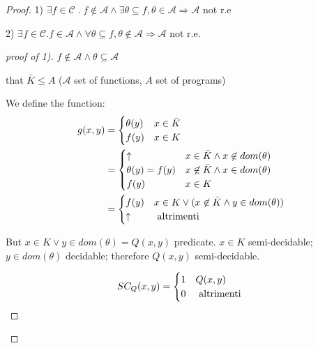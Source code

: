 \begin{theorem}
\begin{proof}
  1)
  $ \exists f \in \mathcal{C} \; . \; f \not\in \mathcal{A} \land
  \exists\theta\subseteq f, \theta\in\mathcal{A} \Rightarrow
  \mathcal{A}$ not r.e

  2)
  $ \exists f \in \mathcal{C}. f\in\mathcal{A} \land
  \forall\theta\subseteq f, \theta\not\in\mathcal{A}\Rightarrow
  \mathcal{A} $ not r.e.

  \begin{proof}[proof of 1)]

    $ f\not\in \mathcal{A} \land \theta\subseteq \mathcal{A}$

    that $
    \bar{K}\leq A $ ($ \mathcal{A} $ set of functions, $A$ set of
    programs)

    We define the function:
    \begin{equation*}
      \begin{aligned}
        g(x,y) & = \begin{cases}
          \theta(y) & x \in \bar{K} \\
          f(y) & x \in K
        \end{cases} \\
               & = \begin{cases}
                 \uparrow & x \in \bar{K} \land x \not\in dom(\theta) \\
                 \theta(y) = f(y) & x \not\in \bar{K} \land x \in dom(\theta) \\
                 f(y) & x\in K
               \end{cases}\\
               &= \begin{cases}
                 f(y) & x \in K\lor(x\not\in\bar{K}\land y\in dom(\theta)) \\
                 \uparrow & $ altrimenti $
               \end{cases}
      \end{aligned}
    \end{equation*}

    But $ x\in K\lor y\in dom(\theta) = Q(x,y)$ predicate. $ x\in K $
    semi-decidable; $ y \in dom(\theta) $ decidable; therefore $ Q(x,y) $
    semi-decidable.

    \begin{equation*}
      SC_Q(x,y) = \begin{cases}
        1 & Q(x,y) \\
        0 & $ altrimenti $
      \end{cases}
    \end{equation*}


\end{proof}
\end{proof}
\end{theorem}
